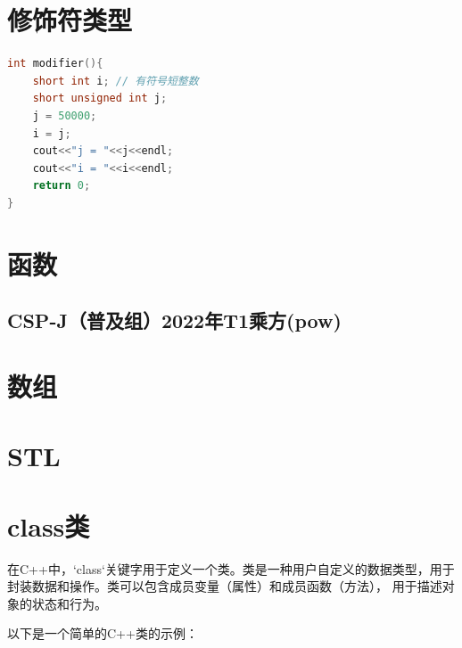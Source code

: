 \documentclass[12pt,twiside,a4paper]{ctexbook}
\numberwithin{chapter}{part}
\begin{document}
\chapter{修饰符类型}
\begin{lstlisting}[language=C++]
int modifier(){
	short int i; // 有符号短整数
	short unsigned int j;
	j = 50000;
	i = j;
	cout<<"j = "<<j<<endl;	
	cout<<"i = "<<i<<endl;	
	return 0;
}
\end{lstlisting}

\chapter{函数}
\section{CSP-J（普及组）2022年T1乘方(pow)}

\chapter{数组}

\chapter{STL}

\chapter{class类}
在C++中，`class`关键字用于定义一个类。类是一种用户自定义的数据类型，用于封装数据和操作。类可以包含成员变量（属性）和成员函数（方法），
用于描述对象的状态和行为。

以下是一个简单的C++类的示例：
\end{document}
